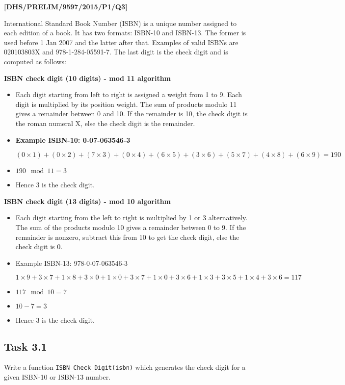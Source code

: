 \item \textbf{{[}DHS/PRELIM/9597/2015/P1/Q3{]} }

International Standard Book Number (ISBN) is a unique number assigned
to each edition of a book. It has two formats: ISBN-10 and ISBN-13.
The former is used before 1 Jan 2007 and the latter after that. Examples
of valid ISBNs are 020103803X and 978-1-284-05591-7. The last digit
is the check digit and is computed as follows:

\textbf{ISBN check digit (10 digits) - mod 11 algorithm} 
\begin{itemize}
\item Each digit starting from left to right is assigned a weight from 1
to 9. Each digit is multiplied by its position weight. The sum of
products modulo 11 gives a remainder between 0 and 10. If the remainder
is 10, the check digit is the roman numeral X, else the check digit
is the remainder.
\item \textbf{Example ISBN-10: 0-07-063546-3 }

$(0\times1)+(0\times2)+(7\times3)+(0\times4)+(6\times5)+(3\times6)+(5\times7)+(4\times8)+(6\times9)=190$
\item $190\mod11=3$
\item Hence 3 is the check digit. 
\end{itemize}
\textbf{ISBN check digit (13 digits) - mod 10 algorithm}
\begin{itemize}
\item Each digit starting from the left to right is multiplied by 1 or 3
alternatively. The sum of the products modulo 10 gives a remainder
between 0 to 9. If the remainder is nonzero, subtract this from 10
to get the check digit, else the check digit is 0. 
\item Example ISBN-13: 978-0-07-063546-3 

$1\times9+3\times7+1\times8+3\times0+1\times0+3\times7+1\times0+3\times6+1\times3+3\times5+1\times4+3\times6=117$
\item $117\mod10=7$
\item $10-7=3$ 
\item Hence 3 is the check digit. 
\end{itemize}

\subsection*{Task 3.1}

Write a function \texttt{ISBN\_Check\_Digit(isbn)} which generates
the check digit for a given ISBN-10 or ISBN-13 number. 

